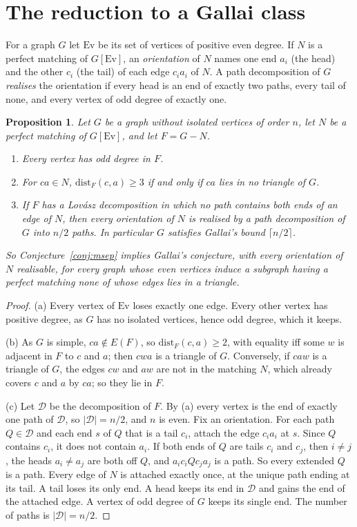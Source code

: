 \documentclass[11pt]{amsart}
\newtheorem{proposition}[theorem]{Proposition}
\theoremstyle{definition}
\newcommand{\Ev}{\mathrm{Ev}}
\newcommand{\cD}{\mathcal D}
\begin{document}
\section{The reduction to a Gallai class}\label{sec:reduction}

For a graph $G$ let $\Ev$ be its set of vertices of positive even degree. If $N$ is a perfect matching
of $G[\Ev]$, an \emph{orientation} of $N$ names one end $a_i$ (the head) and the other $c_i$ (the tail)
of each edge $c_ia_i$ of $N$. A path decomposition of $G$ \emph{realises} the orientation if every head
is an end of exactly two paths, every tail of none, and every vertex of odd degree of exactly one.

\begin{proposition}\label{prop:reduction}
Let $G$ be a graph without isolated vertices of order $n$, let $N$ be a perfect matching of $G[\Ev]$,
and let $F=G-N$.
\begin{enumerate}
\item[(a)] Every vertex has odd degree in $F$.
\item[(b)] For $ca\in N$, $\mathrm{dist}_F(c,a)\ge3$ if and only if $ca$ lies in no triangle of $G$.
\item[(c)] If $F$ has a Lov\'asz decomposition in which no path contains both ends of an edge of $N$, then
every orientation of $N$ is realised by a path decomposition of $G$ into $n/2$ paths. In particular
$G$ satisfies Gallai's bound $\lceil n/2\rceil$.
\end{enumerate}
So Conjecture~\ref{conj:msep} implies Gallai's conjecture, with every orientation of $N$ realisable, for
every graph whose even vertices induce a subgraph having a perfect matching none of whose edges lies in
a triangle.
\end{proposition}

\begin{proof}
(a) Every vertex of $\Ev$ loses exactly one edge. Every other vertex has positive degree, as $G$ has no
isolated vertices, hence odd degree, which it keeps.

(b) As $G$ is simple, $ca\notin E(F)$, so $\mathrm{dist}_F(c,a)\ge2$, with equality iff some $w$ is
adjacent in $F$ to $c$ and $a$; then $cwa$ is a triangle of $G$. Conversely, if $caw$ is a triangle of
$G$, the edges $cw$ and $aw$ are not in the matching $N$, which already covers $c$ and $a$ by $ca$; so
they lie in $F$.

(c) Let $\cD$ be the decomposition of $F$. By (a) every vertex is the end of exactly one path of $\cD$,
so $|\cD|=n/2$, and $n$ is even. Fix an orientation. For each path $Q\in\cD$ and each end $s$ of $Q$
that is a tail $c_i$, attach the edge $c_ia_i$ at $s$. Since $Q$ contains $c_i$, it does not contain
$a_i$. If both ends of $Q$ are tails $c_i$ and $c_j$, then $i\ne j$, the heads $a_i\ne a_j$ are both
off $Q$, and $a_ic_iQc_ja_j$ is a path. So every extended $Q$ is a path. Every edge of $N$ is attached
exactly once, at the unique path ending at its tail. A tail loses its only end. A head keeps its end in
$\cD$ and gains the end of the attached edge. A vertex of odd degree of $G$ keeps its single end. The
number of paths is $|\cD|=n/2$.
\end{proof}
\end{document}
